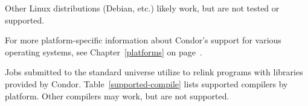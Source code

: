 \Note Other Linux distributions (Debian, etc.) likely work, but are not tested
or supported.

For more platform-specific information about Condor's support for
various operating systems, see Chapter~\ref{platforms} on
page~\pageref{platforms}. 



Jobs submitted to the standard universe utilize 
to relink programs with libraries provided by Condor.
Table~\ref{supported-compile} lists supported compilers by
platform.
Other compilers may work, but are not supported.


